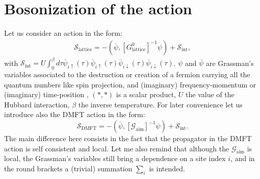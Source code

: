 \documentclass[a4paper,11pt]{article}
\begin{document}
\section{Bosonization of the action} 

Let us consider an action in the form: 
\begin{eqnarray}
\label{slattice} 
\mathcal{S}_{\mathrm{lattice}} = -(\overline \psi, [G^0_{\mathrm{lattice}}]^{-1}\psi)+\mathcal{S}_{\mathrm{int}},
\end{eqnarray}
with $\mathcal{S}_{\mathrm{int}}=U\int_0^\beta d\tau \overline \psi_{i\uparrow}(\tau)\overline \psi_{i\uparrow}(\tau)\overline \psi_{i\downarrow}(\tau)\overline \psi_{i\downarrow}(\tau)$. 
$\psi$ and $\overline \psi$ are Grassman's variables associated to the destruction or creation of a fermion carrying all the quantum numbers like spin projection, and (imaginary) frequency-momentum or (imaginary) time-position , $(*,*)$ is a scalar product, $U$ the value of the Hubbard interaction, $\beta$ the inverse temperature. 
For later convenience let us introduce also the DMFT action in the form: 
\begin{equation}
\label{sdmft}
\mathcal{S}_{\mathrm{DMFT}} = -(\overline \psi, [\mathcal{G}_{\mathrm{aim}}]^{-1}\psi)+\mathcal{S}_{\mathrm{int}}. 
\end{equation}
The main difference here consists in the fact that the propagator in the DMFT action is self consistent and local. Let me also remind that although the $\mathcal{G}_{\mathrm{aim}}$ is local, the Grassman's variables still bring a dependence on a site index $i$, and in the round brackets a (trivial) summation $\sum_i$ is intended. 
\end{document}
